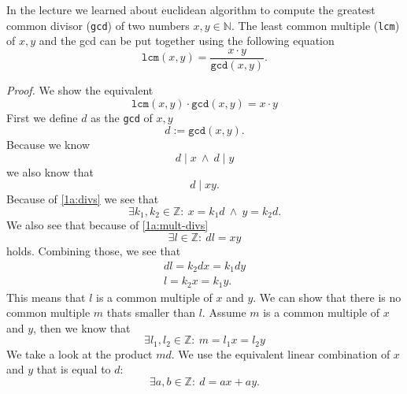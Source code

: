 \documentclass[12pt]{article}
\begin{document}
 

 

  In the lecture we learned about euclidean algorithm to compute the greatest common divisor (\texttt{gcd}) of two numbers $x,y\in \mathbb{N}$. The least common multiple (\texttt{lcm}) of $x,y$ and the gcd can be put together using the following equation \begin{equation}
 	\texttt{lcm}(x,y)=\frac{x\cdot y}{\texttt{gcd}(x,y)}.
 \end{equation}
 
 \textit{Proof.} We show the equivalent \begin{equation}
 	\texttt{lcm}(x,y)\cdot\texttt{gcd}(x,y)=x\cdot y
 \end{equation}First we define $d$ as the \texttt{gcd} of $x,y$ \begin{equation}
 	d:=\texttt{gcd}(x,y).
 \end{equation} Because we know \begin{equation}
 	d\mid x\ \land\ d\mid y \label{1a:divs}
 \end{equation} we also know that \begin{equation}
 	d\mid xy \label{1a:mult-divs}.
 \end{equation} Because of \autoref{1a:divs} we see that \begin{equation}
 	\exists k_1, k_2\in\mathbb{Z}:\ x=k_1d\ \land\ y=k_2d.
 \end{equation} We also see that because of \autoref{1a:mult-divs} \begin{equation}
 	\exists l\in\mathbb{Z}:\ dl=xy \label{1a:l-exists}
 \end{equation} holds. Combining those, we see that \begin{gather}
 	dl=k_2dx=k_1dy \\
 	l=k_2x=k_1y.
 \end{gather} This means that $l$ is a common multiple of $x$ and $y$. We can show that there is no common multiple $m$ thats smaller than $l$. Assume $m$ is a common multiple of $x$ and $y$, then we know that \begin{equation}
 	\exists l_1,l_2\in\mathbb{Z}:\ m=l_1x=l_2y
 \end{equation} We take a look at the product $md$. We use the equivalent linear combination of $x$ and $y$ that is equal to $d$: \begin{equation}
 	\exists a,b\in\mathbb{Z}:\ d=ax+ay.

\end{equation}
\end{document}
